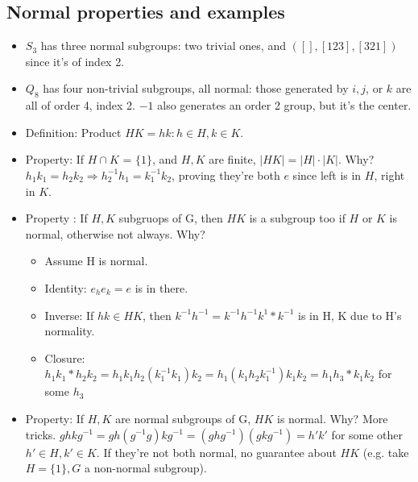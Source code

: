 \documentclass[11pt, oneside]{article}   	%
\begin{document}
\subsection{Normal properties and examples}
\begin{itemize}
\item $S_3$ has three normal subgroups: two trivial ones, and $([], [123], [321])$ since it's of index 2.
\item $Q_8$ has four non-trivial subgroups, all normal: those generated by $i, j$, or $k$ are all of order 4, index 2.  $-1$ also generates an order 2 group, but it's the center.
\item Definition: Product $HK = {hk: h \in H, k \in K}$. 
\item Property: If $H \cap K$ = $\{1\}$, and $H, K$ are finite, $|HK| = |H| \cdot |K|$.  Why?  
  $h_1k_1 = h_2k_2 \Longrightarrow h_2^{-1}h_1 = k_1^{-1}k_2$, proving they're both $e$ since left is in $H$, right in $K$.
\item Property : If $H, K$ subgruops of G, then $HK$ is a subgroup too if $H$ or $K$ is normal, otherwise not always.  Why?   
  \begin{itemize}
  \item Assume H is normal.
  \item Identity: $e_he_k = e$ is in there.
  \item Inverse: If $hk \in HK$, then $k^{-1}h^{-1} = k^{-1}h^{-1}k^1 * k^{-1}$ is in H, K due to H's normality.
  \item Closure: $h_1k_1 * h_2k_2  = h_1k_1h_2(k_1^{-1}k_1)k_2 =   h_1 (k_1h_2k_1^{-1}) k_1k_2 =  h_1h_3 * k_1k_2$ for some $h_3$
  \end{itemize}
\item Property: If $H, K$ are normal subgroups of G, $HK$ is normal.  Why? More tricks.  $ghkg^{-1} = gh(g^{-1}g)kg^{-1} =(ghg^{-1})(gkg^{-1}) = h'k'$ for some other $h' \in H, k' \in K$.  If they're not both normal, no guarantee about $HK$ (e.g. take $H = \{1\}, G$ a non-normal subgroup).  


\end{itemize}
\end{document}
